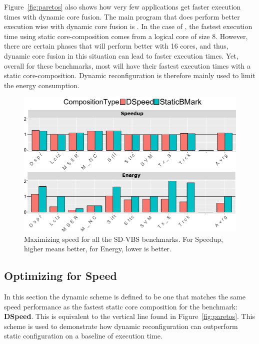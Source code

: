 Figure~\ref{fig:paretos} also shows how very few applications get faster execution times with dynamic core fusion.
The main program that does perform better execution wise with dynamic core fusion is .
In the case of , the fastest execution time using static core-composition comes from a logical core of size 8.
However, there are certain phases that will perform better with 16 cores, and thus, dynamic core fusion in this situation can lead to faster execution times.
Yet, overall for these benchmarks, most will have their fastest execution times with a static core-composition.
Dynamic reconfiguration is therefore mainly used to limit the energy consumption.

\begin{figure}[t]
    \centering
	\includegraphics[width=1\textwidth]{cases-paper/graphics/results/speed_bars2.pdf}
    \caption{Maximizing speed for all the SD-VBS benchmarks. For Speedup, higher means better, for Energy, lower is better.}
    \label{fig:speedres}
	\vspace{1em}
\end{figure}

\subsection{Optimizing for Speed} \label{sec:dyn:speed}

In this section the dynamic scheme is defined to be one that matches the same speed performance as the fastest static core composition for the benchmark: \textbf{DSpeed}.
This is equivalent to the vertical line found in Figure~\ref{fig:paretos}.
This scheme is used to demonstrate how dynamic reconfiguration can outperform static configuration on a baseline of execution time.

